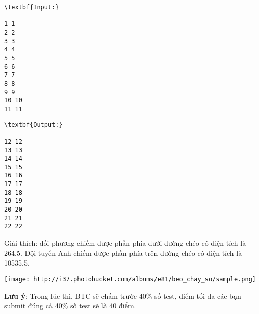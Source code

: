 \begin{verbatim}
\textbf{Input:}

1 1
2 2
3 3
4 4
5 5
6 6
7 7
8 8
9 9
10 10
11 11\end{verbatim}
\begin{verbatim}
\textbf{Output:}

12 12
13 13
14 14
15 15
16 16
17 17
18 18
19 19
20 20
21 21 
22 22\end{verbatim}

Giải thích: đối phương chiếm được phần phía dưới đường chéo có diện tích là 264.5. Đội tuyển Anh chiếm được phần phía trên đường chéo có diện tích là 10535.5.


\texttt{[image: http://i37.photobucket.com/albums/e81/beo\_chay\_so/sample.png]}

\textbf{Lưu ý}: Trong lúc thi, BTC sẽ chấm trước 40\% số test, điểm tối đa các bạn submit đúng cả 40\% số test sẽ là 40 điểm.